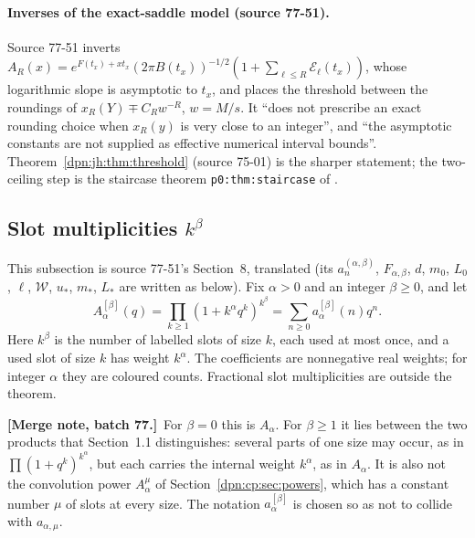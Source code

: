 \documentclass[11pt]{article}
\numberwithin{equation}{section}
\theoremstyle{definition}\newtheorem{definition}[theorem]{Definition}
\theoremstyle{remark}\newtheorem{remark}[theorem]{Remark}
\newcommand{\src}[1]{\textup{(source #1)}}
\newcommand{\mergenotec}[1]{\par\smallskip\noindent\textbf{[Merge note, batch 77.]}\ #1\par\smallskip}
\begin{document}
\paragraph{Inverses of the exact-saddle model \src{77-51}.}
Source 77-51 inverts $A_R(x)=e^{F(t_x)+xt_x}(2\pi B(t_x))^{-1/2}
(1+\sum_{\ell\le R}\mathcal E_\ell(t_x))$, whose logarithmic slope is
asymptotic to $t_x$, and places the threshold between the roundings of
$x_R(Y)\mp C_Rw^{-R}$, $w=M/s$.  It ``does not prescribe an exact rounding
choice when $x_R(y)$ is very close to an integer'', and ``the asymptotic
constants are not supplied as effective numerical interval bounds''.
Theorem~\ref{dpn:jh:thm:threshold} \src{75-01} is the sharper statement; the
two-ceiling step is the staircase theorem \texttt{p0:thm:staircase} of
\cite{tai}.

\subsection{Slot multiplicities \texorpdfstring{$k^\beta$}{k\textasciicircum beta}}\label{dpn:fp:sec:family}
This subsection is source 77-51's Section~8, translated (its $a^{(\alpha,\beta)}_n$,
$F_{\alpha,\beta}$, $d$, $m_0$, $L_0$, $\ell$, $\mathcal W$, $u_*$, $m_*$,
$L_*$ are written as below).  Fix $\alpha>0$ and an integer $\beta\ge0$, and let
\begin{equation}\label{dpn:fp:eq:family}
 A^{[\beta]}_\alpha(q)=\prod_{k\ge1}(1+k^\alpha q^k)^{k^\beta}
 =\sum_{n\ge0}a^{[\beta]}_\alpha(n)q^n .
\end{equation}
Here $k^\beta$ is the number of labelled slots of size $k$, each used at most
once, and a used slot of size $k$ has weight $k^\alpha$.  The coefficients are
nonnegative real weights; for integer $\alpha$ they are coloured counts.
Fractional slot multiplicities are outside the theorem.
\mergenotec{For $\beta=0$ this is $A_\alpha$.  For $\beta\ge1$ it lies
between the two products that Section~1.1 distinguishes: several parts of
one size may occur, as in $\prod(1+q^k)^{k^\alpha}$, but each carries the
internal weight $k^\alpha$, as in $A_\alpha$.  It is also not the convolution
power $A_\alpha^\mu$ of Section~\ref{dpn:cp:sec:powers}, which has a constant
number $\mu$ of slots at every size.  The notation $a^{[\beta]}_\alpha$ is
chosen so as not to collide with $a_{\alpha,\mu}$.}
\end{document}
